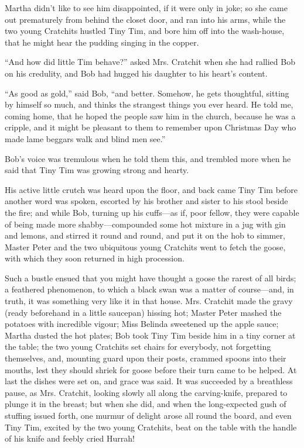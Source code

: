 \documentclass[paper=a5,BCOR=15mm,twoside,DIV=15,headinclude=off,12pt,chapterprefix=off,openany,headings=huge]{scrbook} %
\begin{document}
Martha didn't like to see him disappointed, if it were only in joke; so she came out prematurely from behind the closet door, and ran into his arms, while the two young Cratchits hustled Tiny Tim, and bore him off into the wash-house, that he might hear the pudding singing in the copper.

\enquote{And how did little Tim behave?} asked Mrs. Cratchit when she had rallied Bob on his credulity, and Bob had hugged his daughter to his heart's content.

\enquote{As good as gold,} said Bob, \enquote{and better. Somehow, he gets thoughtful, sitting by himself so much, and thinks the strangest things you ever heard. He told me, coming home, that he hoped the people saw him in the church, because he was a cripple, and it might be pleasant to them to remember upon Christmas Day who made lame beggars walk and blind men see.}

Bob's voice was tremulous when he told them this, and trembled more when he said that Tiny Tim was growing strong and hearty.

His active little crutch was heard upon the floor, and back came Tiny Tim before another word was spoken, escorted by his brother and sister to his stool beside the fire; and while Bob, turning up his cuffs—as if, poor fellow, they were capable of being made more shabby—compounded some hot mixture in a jug with gin and lemons, and stirred it round and round, and put it on the hob to simmer, Master Peter and the two ubiquitous young Cratchits went to fetch the goose, with which they soon returned in high procession.



Such a bustle ensued that you might have thought a goose the rarest of all birds; a feathered phenomenon, to which a black swan was a matter of course—and, in truth, it was something very like it in that house. Mrs. Cratchit made the gravy (ready beforehand in a little saucepan) hissing hot; Master Peter mashed the potatoes with incredible vigour; Miss Belinda sweetened up the apple sauce; Martha dusted the hot plates; Bob took Tiny Tim beside him in a tiny corner at the table; the two young Cratchits set chairs for everybody, not forgetting themselves, and, mounting guard upon their posts, crammed spoons into their mouths, lest they should shriek for goose before their turn came to be helped. At last the dishes were set on, and grace was said. It was succeeded by a breathless pause, as Mrs. Cratchit, looking slowly all along the carving-knife, prepared to plunge it in the breast; but when she did, and when the long-expected gush of stuffing issued forth, one murmur of delight arose all round the board, and even Tiny Tim, excited by the two young Cratchits, beat on the table with the handle of his knife and feebly cried Hurrah!
\end{document}
